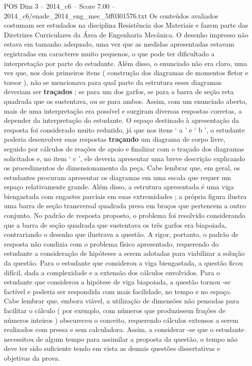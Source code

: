 \begin{textsample}{POS Dim 3 – 2014\_c6 – Score 7.00 – 2014\_c6/enade\_2014\_eng\_mec\_5ff0301576.txt}
Os conteúdos avaliados costumam ser estudados na disciplina Resistência dos Materiais e fazem parte das Diretrizes Curriculares da Área de Engenharia Mecânica.
O desenho impresso não estava em tamanho adequado, uma vez que as medidas apresentadas estavam registradas em caracteres muito pequenos, o que pode ter dificultado a interpretação por parte do estudante.
Além disso, o enunciado não era claro, uma vez que, nos dois primeiros itens ( construção dos diagramas de momentos fletor e torsor ), não se mencionava para qual parte da estrutura esses diagramas deveriam ser \textbf{traçados} ; se para um dos garfos, se para a barra de seção reta quadrada que os sustentava, ou se para ambos.
Assim, com um enunciado aberto, mais de uma interpretação era possível e surgiram diversas respostas corretas, a depender da interpretação do estudante.
O espaço destinado à apresentação da resposta foi considerado muito reduzido, já que nos itens ‘ a ’ e ‘ b ’, o estudante poderia desenvolver suas respostas \textbf{traçando} um diagrama de corpo livre, seguido por cálculos de reações de apoio e finalizar com o traçado dos diagramas solicitados e, no item ‘ c ’, ele deveria apresentar uma breve descrição explicando os procedimentos de dimensionamento da peça.
Cabe lembrar que, em geral, os estudantes procuram apresentar os diagramas em uma escala que requer um espaço relativamente grande.
Além disso, a estrutura apresentada é uma viga biengastada com engastes parciais em suas extremidades ; a própria figura ilustra uma barra de seção transversal quadrada presa em braços que pertencem a outro conjunto.
No padrão de resposta proposto, o problema foi resolvido considerando que a barra de seção quadrada que sustentava os três garfos era biapoiada, contrariando o desenho que ilustrava a questão.
A rigor, portanto, o padrão de resposta não condizia com o problema físico apresentado, requerendo do estudante a consideração de hipóteses a serem adotadas para viabilizar a solução da questão.
Para o estudante que considerou a viga biengastada, a questão ficou difícil, dada a complexidade e a extensão dos cálculos envolvidos.
Para o estudante que considerou a hipótese de viga biapoiada, a questão tornou -se factível e poderia ser respondida com mais facilidade, no tempo e no espaço.
Cabe lembrar que, embora viável, a utilização de dimensões não pensadas para facilitar o cálculo ( por exemplo, com números que produzissem frações de números inteiros ) obscureceu o conceito, requerendo cálculos extensos a serem realizados com pressa e sem calculadora.
Assim, a considerar -se que o estudante necessitou de algum tempo para assimilar a proposta da questão, o tempo não deve ter sido suficiente tendo em vista as demais questões dissertativas e objetivas da prova.

\end{textsample}
